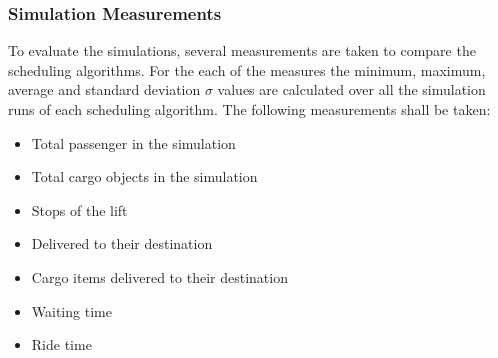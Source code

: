 \subsubsection{Simulation Measurements}
To evaluate the simulations, several measurements are taken to compare the scheduling algorithms.
For the each of the measures the minimum, maximum, average and standard deviation $ \sigma{} $ values are calculated over all the simulation runs of each scheduling algorithm.  
The following measurements shall be taken:
\begin{samepage}
\begin{itemize}
    \item Total passenger in the simulation
    \item Total cargo objects in the simulation
    \item Stops of the lift
    \item Delivered to their destination
    \item Cargo items delivered to their destination
    \item Waiting time
    \item Ride time
\end{itemize}
\end{samepage}
 



